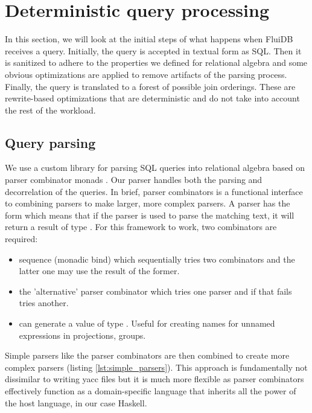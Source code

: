 \section{Deterministic query processing}
\label{sec:query_processing}

In this section, we will look at the initial steps of what happens when
FluiDB receives a query. Initially, the query is accepted in textual
form as SQL. Then it is sanitized to adhere to the properties we
defined for relational algebra and some obvious optimizations are
applied to remove artifacts of the parsing process. Finally, the query
is translated to a forest of possible join orderings. These are
rewrite-based optimizations that are deterministic and do not take
into account the rest of the workload.

\subsection{Query parsing}
\label{sec:query_parsing}

We use a custom library for parsing SQL queries into relational
algebra based on parser combinator monads
\cite{leijenParsecDirectStyle}. Our parser handles both the parsing
and decorrelation of the queries. In brief, parser combinators is a
functional interface to combining parsers to make larger, more complex parsers. A
parser  has the form  which means that if the parser
is used to parse the matching text, it will return a result of type
. For this framework to work, two combinators are required:

\begin{itemize}
\item sequence (monadic bind)  which sequentially tries two combinators and the latter one may
  use the result of the former.
\item the 'alternative' parser combinator  which tries one parser and if that fails tries another.
\item {} can generate a value of type . Useful for creating names for unnamed expressions in
  projections, groups.
\end{itemize}

Simple parsers like the  parser combinators are then
combined to create more complex parsers (listing
\ref{lst:simple_parsers}). This approach is fundamentally not
dissimilar to writing yacc files but it is much more flexible as parser combinators
effectively function as a domain-specific language that inherits all the power of 
the host language, in our case Haskell.

